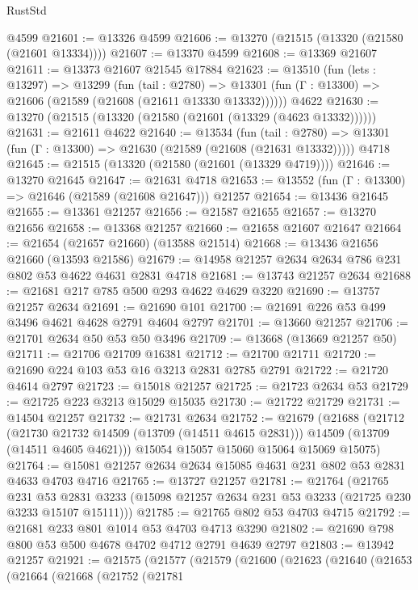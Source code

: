 \begin{lexlean}{RustStd}
\begin{coremodule}
    @4599
@21601 := @13326 @4599
@21606 := @13270 (@21515 (@13320 (@21580 (@21601 @13334))))
@21607 := @13370 @4599
@21608 := @13369 @21607
@21611 := @13373 @21607 @21545 @17884
@21623 := @13510
    (fun (lets : @13297) =>
    @13299
      (fun (tail : @2780) =>
      @13301 (fun (Γ : @13300) => @21606 (@21589 (@21608 (@21611 @13330 @13332))))))
    @4622
@21630 := @13270 (@21515 (@13320 (@21580 (@21601 (@13329 (@4623 @13332))))))
@21631 := @21611 @4622
@21640 := @13534
    (fun (tail : @2780) => @13301 (fun (Γ : @13300) => @21630 (@21589 (@21608 (@21631 @13332)))))
    @4718
@21645 := @21515 (@13320 (@21580 (@21601 (@13329 @4719))))
@21646 := @13270 @21645
@21647 := @21631 @4718
@21653 := @13552 (fun (Γ : @13300) => @21646 (@21589 (@21608 @21647))) @21257
@21654 := @13436 @21645
@21655 := @13361 @21257
@21656 := @21587 @21655
@21657 := @13270 @21656
@21658 := @13368 @21257
@21660 := @21658 @21607 @21647
@21664 := @21654 (@21657 @21660) (@13588 @21514)
@21668 := @13436 @21656 @21660 (@13593 @21586)
@21679 := @14958 @21257 @2634 @2634 @786 @231 @802 @53 @4622 @4631 @2831 @4718
@21681 := @13743 @21257 @2634
@21688 := @21681 @217 @785 @500 @293 @4622 @4629 @3220
@21690 := @13757 @21257 @2634
@21691 := @21690 @101
@21700 := @21691 @226 @53 @499 @3496 @4621 @4628 @2791 @4604 @2797
@21701 := @13660 @21257
@21706 := @21701 @2634 @50 @53 @50 @3496
@21709 := @13668 (@13669 @21257 @50)
@21711 := @21706 @21709 @16381
@21712 := @21700 @21711
@21720 := @21690 @224 @103 @53 @16 @3213 @2831 @2785 @2791
@21722 := @21720 @4614 @2797
@21723 := @15018 @21257
@21725 := @21723 @2634 @53
@21729 := @21725 @223 @3213 @15029 @15035
@21730 := @21722 @21729
@21731 := @14504 @21257
@21732 := @21731 @2634
@21752 := @21679
    (@21688
      (@21712
        (@21730 @21732 @14509 (@13709 (@14511 @4615 @2831)))
        @14509
        (@13709 (@14511 @4605 @4621)))
      @15054
      @15057
      @15060
      @15064
      @15069
      @15075)
@21764 := @15081 @21257 @2634 @2634 @15085 @4631 @231 @802 @53 @2831 @4633 @4703 @4716
@21765 := @13727 @21257
@21781 := @21764
    (@21765
      @231
      @53
      @2831
      @3233
      (@15098 @21257 @2634 @231 @53 @3233 (@21725 @230 @3233 @15107 @15111)))
@21785 := @21765 @802 @53 @4703 @4715
@21792 := @21681 @233 @801 @1014 @53 @4703 @4713 @3290
@21802 := @21690 @798 @800 @53 @500 @4678 @4702 @4712 @2791 @4639 @2797
@21803 := @13942 @21257
@21921 := @21575
    (@21577
      (@21579
        (@21600
          (@21623
            (@21640
              (@21653
                (@21664
                  (@21668
                    (@21752
                      (@21781

\end{coremodule}
\end{lexlean}
